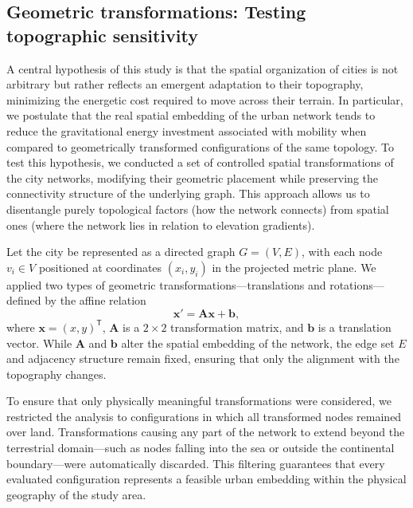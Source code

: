 \documentclass[twocolumn,amsmath,amssymb,floatfix,nature,shownopacs,footinbib,superscriptaddress]{revtex4-1} %
\begin{document}
\subsection*{Geometric transformations: Testing topographic sensitivity}
\label{sec:transformations}

A central hypothesis of this study is that the spatial organization of cities is not arbitrary but rather reflects an emergent adaptation to their topography, minimizing the energetic cost required to move across their terrain. 
In particular, we postulate that the real spatial embedding of the urban network tends to reduce the gravitational energy investment associated with mobility when compared to geometrically transformed configurations of the same topology. 
To test this hypothesis, we conducted a set of controlled spatial transformations of the city networks, modifying their geometric placement while preserving the connectivity structure of the underlying graph. 
This approach allows us to disentangle purely topological factors (how the network connects) from spatial ones (where the network lies in relation to elevation gradients).

Let the city be represented as a directed graph $G = (V, E)$, with each node $v_i \in V$ positioned at coordinates $(x_i, y_i)$ in the projected metric plane. 
We applied two types of geometric transformations—translations and rotations—defined by the affine relation
\[
\mathbf{x}' = \mathbf{A} \mathbf{x} + \mathbf{b},
\]
where $\mathbf{x} = (x, y)^{\mathsf{T}}$, $\mathbf{A}$ is a $2\times2$ transformation matrix, and $\mathbf{b}$ is a translation vector. 
While $\mathbf{A}$ and $\mathbf{b}$ alter the spatial embedding of the network, the edge set $E$ and adjacency structure remain fixed, ensuring that only the alignment with the topography changes.

To ensure that only physically meaningful transformations were considered, we restricted the analysis to configurations in which all transformed nodes remained over land. 
Transformations causing any part of the network to extend beyond the terrestrial domain—such as nodes falling into the sea or outside the continental boundary—were automatically discarded. 
This filtering guarantees that every evaluated configuration represents a feasible urban embedding within the physical geography of the study area.
\end{document}
